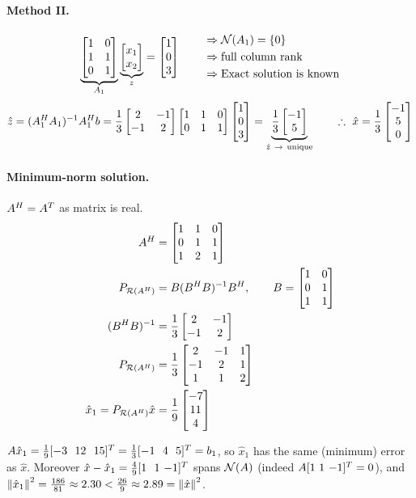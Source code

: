 \begin{example}
\paragraph{Method II.}
\[
\underbrace{\begin{bmatrix}1&0\\1&1\\0&1\end{bmatrix}}_{A_1}\underbrace{\begin{bmatrix}x_1\\x_2\end{bmatrix}}_{z}=\begin{bmatrix}1\\0\\3\end{bmatrix}
\qquad
\begin{aligned}
&\Rightarrow\mathcal{N}(A_1)=\{0\}\\
&\Rightarrow\text{full column rank}\\
&\Rightarrow\text{Exact solution is known}
\end{aligned}
\]
\[
\hat{z}=(A_1\Hm A_1)^{-1}A_1\Hm b=\frac13\bmat{2&-1\\-1&2}\bmat{1&1&0\\0&1&1}\bmat{1\\0\\3}=\underbrace{\frac13\bmat{-1\\5}}_{\hat{z}\ \to\ \text{unique}}
\qquad\therefore\ \hat{x}=\frac13\bmat{-1\\5\\0}
\]

\paragraph{Minimum-norm solution.} $A^{H}=A^{T}$ as matrix is real.
\begin{align*}
A^{H}&=\begin{bmatrix}1&1&0\\0&1&1\\1&2&1\end{bmatrix}\\
P_{\mathcal{R}(A^{H})}&=B(B^{H} B)^{-1}B^{H},\qquad B=\begin{bmatrix}1&0\\0&1\\1&1\end{bmatrix}\\
(B^{H} B)^{-1}&=\frac13\begin{bmatrix}2&-1\\-1&2\end{bmatrix}\\
P_{\mathcal{R}(A^{H})}&=\frac13\begin{bmatrix}2&-1&1\\-1&2&1\\1&1&2\end{bmatrix}\\
\hat{x}_1=P_{\mathcal{R}(A^{H})}\hat{x}&=\frac19\begin{bmatrix}-7\\11\\4\end{bmatrix}
\end{align*}
\begin{insight}[Check]
$A\hat x_1=\tfrac19[-3\ \ 12\ \ 15]\T=\tfrac13[-1\ \ 4\ \ 5]\T=b_1$, so $\hat x_1$ has the same (minimum) error as $\hat x$. Moreover $\hat x-\hat x_1=\tfrac49[1\ \ 1\ {-1}]\T$ spans $\mathcal{N}(A)$ (indeed $A[1\ 1\ {-1}]^{T}=0$), and
$\left\lVert \hat x_1 \right\rVert^2=\tfrac{186}{81}\approx2.30<\tfrac{26}{9}\approx2.89=\left\lVert \hat x \right\rVert^2$.
\end{insight}
\end{example}
